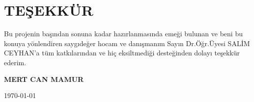 \section*{TEŞEKKÜR}
Bu projenin başından sonuna kadar hazırlanmasında  emeği bulunan ve 
beni bu konuya yönlendiren saygıdeğer hocam ve danışmanım 
Sayın Dr.Öğr.Üyesi SALİM CEYHAN'a tüm katkılarından ve hiç eksiltmediği desteğinden dolayı teşekkür ederim.
\vspace{2cm}

\begin{flushright}
\textbf{MERT CAN MAMUR}

\today
\end{flushright}